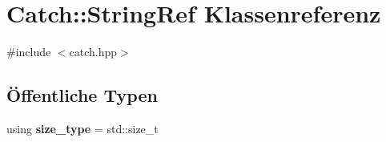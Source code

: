 \hypertarget{classCatch_1_1StringRef}{}\section{Catch\+:\+:String\+Ref Klassenreferenz}
\label{classCatch_1_1StringRef}


{\ttfamily \#include $<$catch.\+hpp$>$}

\subsection*{Öffentliche Typen}
\begin{DoxyCompactItemize}
\item 
\mbox{\label{classCatch_1_1StringRef_a06b4db8fc82b197004291cf370b2ba7c}} 
using {\bfseries size\+\_\+type} = std\+::size\+\_\+t
\end{DoxyCompactItemize}
